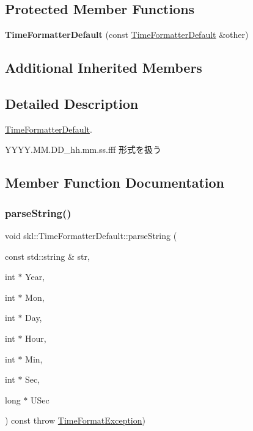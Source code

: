 \subsection*{Protected Member Functions}
\begin{DoxyCompactItemize}
\item 
\hypertarget{classskl_1_1_time_formatter_default_ac96f3974a6623e1385d7dba188939ff9}{}\label{classskl_1_1_time_formatter_default_ac96f3974a6623e1385d7dba188939ff9} 
{\bfseries Time\+Formatter\+Default} (const \hyperlink{classskl_1_1_time_formatter_default}{Time\+Formatter\+Default} \&other)
\end{DoxyCompactItemize}
\subsection*{Additional Inherited Members}


\subsection{Detailed Description}
\hyperlink{classskl_1_1_time_formatter_default}{Time\+Formatter\+Default}. 

Y\+Y\+Y\+Y.\+M\+M.\+D\+D\+\_\+hh.\+mm.\+ss.\+fff 形式を扱う 

\subsection{Member Function Documentation}
\hypertarget{classskl_1_1_time_formatter_default_a803104c1e78b366dc9f4c6fecb632c11}{}\label{classskl_1_1_time_formatter_default_a803104c1e78b366dc9f4c6fecb632c11} 
\subsubsection{\texorpdfstring{parse\+String()}{parseString()}}
{\footnotesize\ttfamily void skl\+::\+Time\+Formatter\+Default\+::parse\+String (\begin{DoxyParamCaption}\item[{const std\+::string \&}]{str,  }\item[{int $\ast$}]{Year,  }\item[{int $\ast$}]{Mon,  }\item[{int $\ast$}]{Day,  }\item[{int $\ast$}]{Hour,  }\item[{int $\ast$}]{Min,  }\item[{int $\ast$}]{Sec,  }\item[{long $\ast$}]{U\+Sec }\end{DoxyParamCaption}) const throw  \hyperlink{classskl_1_1_time_format_exception}{Time\+Format\+Exception}) \hspace{0.3cm}{\ttfamily [virtual]}}



